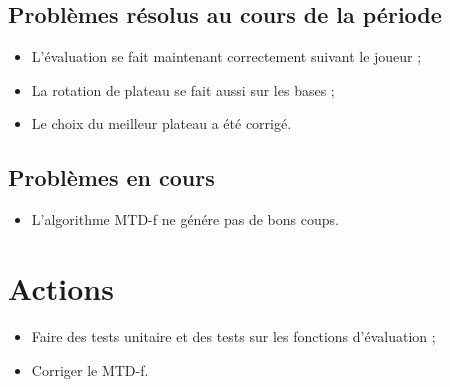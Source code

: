 \documentclass[a4paper]{article}
\begin{document}
	\subsection*{Problèmes résolus au cours de la période}
		\begin{itemize}
			\item L'évaluation se fait maintenant correctement suivant le joueur ;
			\item La rotation de plateau se fait aussi sur les bases ;
			\item Le choix du meilleur plateau a été corrigé.
		\end{itemize}

	\subsection*{Problèmes en cours}
		\begin{itemize}
			\item L'algorithme MTD-f ne génére pas de bons coups.
		\end{itemize}

\section*{Actions}
	\begin{itemize}
		\item Faire des tests unitaire et des tests sur les fonctions d'évaluation ;
		\item Corriger le MTD-f.
	\end{itemize}
\end{document}
